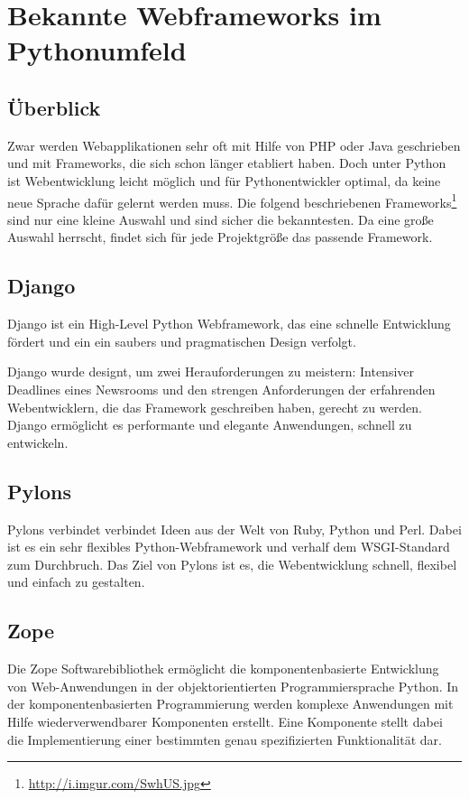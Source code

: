 \section{Bekannte Webframeworks im Pythonumfeld}
\subsection{Überblick}
Zwar werden Webapplikationen sehr oft mit Hilfe von PHP oder Java geschrieben
und mit Frameworks, die sich schon länger etabliert haben. Doch unter Python 
ist Webentwicklung leicht möglich und für Pythonentwickler optimal, da keine
neue Sprache dafür gelernt werden muss. Die folgend beschriebenen
Frameworks\footnote{\url{http://i.imgur.com/SwhUS.jpg}} sind nur eine kleine 
Auswahl und sind sicher die bekanntesten. Da eine große Auswahl herrscht,
findet sich für jede Projektgröße das passende Framework. 

\subsection{Django}
Django ist ein High-Level Python Webframework, das eine schnelle Entwicklung
fördert und ein ein saubers und pragmatischen Design verfolgt. 

Django wurde designt, um zwei Herauforderungen zu meistern: Intensiver
Deadlines eines Newsrooms und den strengen Anforderungen der erfahrenden
Webentwicklern, die das Framework geschreiben haben, gerecht zu werden. Django
ermöglicht es performante und elegante Anwendungen, schnell zu entwickeln.
\cite{django}


\subsection{Pylons}
Pylons verbindet verbindet Ideen aus der Welt von Ruby, Python und Perl. Dabei
ist es ein sehr flexibles Python-Webframework und verhalf dem WSGI-Standard zum
Durchbruch. Das Ziel von Pylons ist es, die Webentwicklung schnell, flexibel und
einfach zu gestalten.\cite{pylons}

\subsection{Zope}
Die Zope Softwarebibliothek ermöglicht die komponentenbasierte Entwicklung von 
Web-Anwendungen in der objektorientierten Programmiersprache Python. In der 
komponentenbasierten Programmierung werden komplexe Anwendungen mit Hilfe 
wiederverwendbarer Komponenten erstellt. Eine Komponente stellt dabei  die
Implementierung einer bestimmten genau spezifizierten Funktionalität
dar.\cite{ueberzope}

